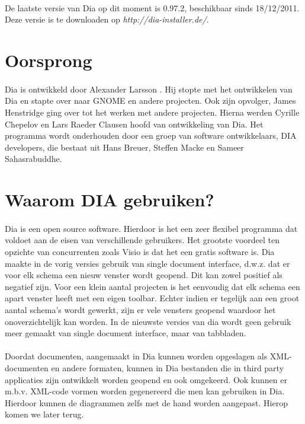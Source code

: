 \documentclass[12pt,a4paper]{report}
\begin{document}
\begin{flushleft}
\paragraph*{}
De laatste versie van Dia op dit moment is 0.97.2, beschikbaar sinds 18/12/2011. Deze versie is te downloaden op \textit{http://dia-installer.de/}.
\pagebreak
\section{Oorsprong}
\paragraph*{}
Dia is ontwikkeld door Alexander Larsson . Hij stopte met het ontwikkelen van Dia en stapte over naar GNOME en andere projecten. Ook zijn opvolger, James Henstridge ging over tot het werken met andere projecten. Hierna werden Cyrille Chepelov en Lars Raeder Clausen hoofd van ontwikkeling van Dia. Het programma wordt onderhouden door een groep van software ontwikkelaars, DIA developers, die bestaat uit Hans Breuer, Steffen Macke en Sameer Sahasrabuddhe.
\section{Waarom DIA gebruiken?}
\paragraph*{}
Dia is een open source software. Hierdoor is het een zeer flexibel programma dat voldoet aan de eisen van verschillende gebruikers. Het grootste voordeel ten opzichte van concurrenten zoals Visio is dat het een gratis software is. Dia maakte in de vorig versies gebruik van single document interface, d.w.z. dat er voor elk schema een nieuw venster wordt geopend. Dit kan zowel positief als negatief zijn. Voor een klein aantal projecten is het eenvoudig dat elk schema een apart venster heeft met een eigen toolbar. Echter indien er tegelijk aan een groot aantal schema's wordt gewerkt, zijn er vele vensters geopend waardoor het onoverzichtelijk kan worden. In de nieuwste versies van dia wordt geen gebruik meer gemaakt van single document interface, maar van tabbladen.
\paragraph*{}
Doordat documenten, aangemaakt in Dia kunnen worden opgeslagen als XML-documenten en andere formaten, kunnen in Dia bestanden die in third party applicaties zijn ontwikkelt worden geopend en ook omgekeerd. Ook kunnen er m.b.v. XML-code vormen worden gegenereerd die men kan gebruiken in Dia. Hierdoor kunnen de diagrammen zelfs met de hand worden aangepast. Hierop komen we later terug.

\end{flushleft}
\end{document}
